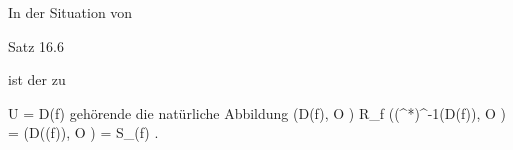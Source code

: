 {}
{





In der Situation von

Satz 16.6

ist der zu

\mavergleichskette
{\vergleichskette
{ U
}
{ = }{ D(f)
}
{  }{
}
{    }{
}
{   }{
}
}
{}{}{}
gehörende
die natürliche Abbildung
\maabbdisp {} { \Gamma (D(f), {\mathcal O} ) \cong R_f } { \Gamma ((\varphi^*)^{-1}(D(f)), {\mathcal O} ) = \Gamma (D(\varphi(f)), {\mathcal O} ) =  S_{\varphi(f)}
} {.}





}





